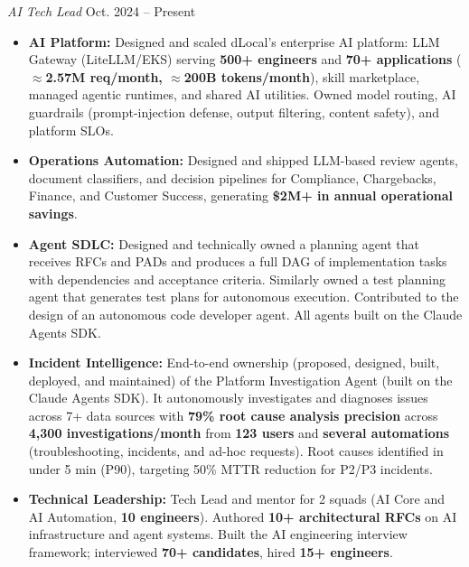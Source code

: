 \documentclass[letterpaper,11pt]{article}
\newcommand{\resumeItem}[1]{
  \item{\small
    {#1 \vspace{-1pt}}
  }
}
\newcommand{\resumeItemListStart}{\begin{itemize}}
\newcommand{\resumeItemListEnd}{\end{itemize}\vspace{0pt}}
\begin{document}
    \vspace{2pt}
    \textit{AI Tech Lead} \hfill \small Oct. 2024 -- Present
    \resumeItemListStart
        \resumeItem{\textbf{AI Platform:} Designed and scaled dLocal's enterprise AI platform: LLM Gateway (LiteLLM/EKS) serving \textbf{500+ engineers} and \textbf{70+ applications} (\textbf{$\approx$2.57M req/month, $\approx$200B tokens/month}), skill marketplace, managed agentic runtimes, and shared AI utilities. Owned model routing, AI guardrails (prompt-injection defense, output filtering, content safety), and platform SLOs.}
        \resumeItem{\textbf{Operations Automation:} Designed and shipped LLM-based review agents, document classifiers, and decision pipelines for Compliance, Chargebacks, Finance, and Customer Success, generating \textbf{\$2M+ in annual operational savings}.}
        \resumeItem{\textbf{Agent SDLC:} Designed and technically owned a planning agent that receives RFCs and PADs and produces a full DAG of implementation tasks with dependencies and acceptance criteria. Similarly owned a test planning agent that generates test plans for autonomous execution. Contributed to the design of an autonomous code developer agent. All agents built on the Claude Agents SDK.}
        \resumeItem{\textbf{Incident Intelligence:} End-to-end ownership (proposed, designed, built, deployed, and maintained) of the Platform Investigation Agent (built on the Claude Agents SDK). It autonomously investigates and diagnoses issues across 7+ data sources with \textbf{79\% root cause analysis precision} across \textbf{4,300 investigations/month} from \textbf{123 users} and \textbf{several automations} (troubleshooting, incidents, and ad-hoc requests). Root causes identified in under 5 min (P90), targeting 50\% MTTR reduction for P2/P3 incidents.}
        \resumeItem{\textbf{Technical Leadership:} Tech Lead and mentor for 2 squads (AI Core and AI Automation, \textbf{10 engineers}). Authored \textbf{10+ architectural RFCs} on AI infrastructure and agent systems. Built the AI engineering interview framework; interviewed \textbf{70+ candidates}, hired \textbf{15+ engineers}.}
    \resumeItemListEnd
\end{document}
